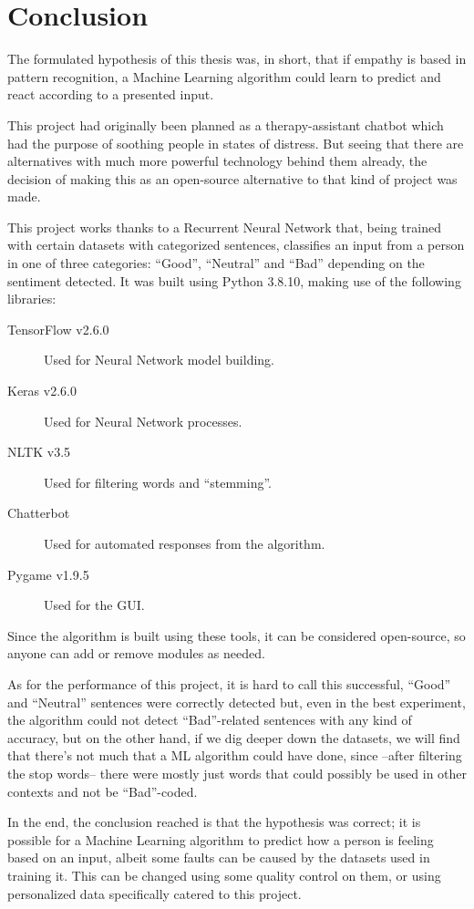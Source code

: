 \chapter{Conclusion}
\label{ch6}
The formulated hypothesis of this thesis was, in short, that if empathy is based in pattern recognition, a Machine Learning algorithm could learn to predict and react according to a presented input.

This project had originally been planned as a therapy-assistant chatbot which had the purpose of soothing people in states of distress. But seeing that there are alternatives with much more powerful technology behind them already, the decision of making this as an open-source alternative to that kind of project was made.

This project works thanks to a Recurrent Neural Network that, being trained with certain datasets with categorized sentences, classifies an input from a person in one of three categories: ``Good'', ``Neutral'' and ``Bad'' depending on the sentiment detected. It was built using Python 3.8.10, making use of the following libraries:
\begin{description}
	\item[TensorFlow v2.6.0]{Used for Neural Network model building.}
	\item[Keras v2.6.0]{Used for Neural Network processes.}
	\item[NLTK v3.5]{Used for filtering words and ``stemming''.}
	\item[Chatterbot]{Used for automated responses from the algorithm.}
	\item[Pygame v1.9.5]{Used for the GUI.}
\end{description}

Since the algorithm is built using these tools, it can be considered open-source, so anyone can add or remove modules as needed.

As for the performance of this project, it is hard to call this successful, ``Good'' and ``Neutral'' sentences were correctly detected but, even in the best experiment, the algorithm could not detect ``Bad''-related sentences with any kind of accuracy, but on the other hand, if we dig deeper down the datasets, we will find that there's not much that a ML algorithm could have done, since --after filtering the stop words-- there were mostly just words that could possibly be used in other contexts and not be ``Bad''-coded.

In the end, the conclusion reached is that the hypothesis was correct; it is possible for a Machine Learning algorithm to predict how a person is feeling based on an input, albeit some faults can be caused by the datasets used in training it. This can be changed using some quality control on them, or using personalized data specifically catered to this project.

